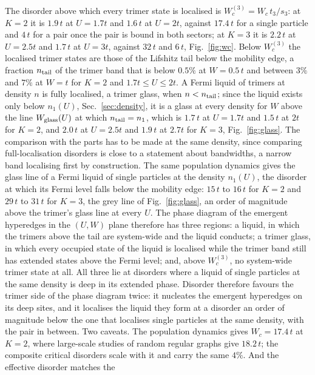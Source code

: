 \documentclass[aps,pre,twocolumn,superscriptaddress,floatfix]{revtex4-2}
\begin{document}
The disorder above which every trimer state is localised is
$W_{c}^{(3)}=W_{c}\,t_{3}/s_{3}$: at $K=2$ it is $1.9\,t$ at $U=1.7t$ and
$1.6\,t$ at $U=2t$, against $17.4\,t$ for a single particle and $4\,t$
for a pair once the pair is bound in both sectors; at $K=3$ it is
$2.2\,t$ at $U=2.5t$ and $1.7\,t$ at $U=3t$, against $32\,t$ and $6\,t$,
Fig.~\ref{fig:wc}. Below $W_{c}^{(3)}$ the localised trimer states are
those of the Lifshitz tail below the mobility edge, a fraction
$n_{\rm tail}$ of the trimer band that is below $0.5\%$ at $W=0.5\,t$
and between $3\%$ and $7\%$ at $W=t$ for $K=2$ and $1.7t\le U\le2t$. A
Fermi liquid of trimers at density $n$ is fully localised, a trimer
glass, when $n<n_{\rm tail}$; since the liquid exists only below
$n_{1}(U)$, Sec.~\ref{sec:density}, it is a glass at every density for
$W$ above the line $W_{\rm glass}(U)$ at which $n_{\rm tail}=n_{1}$,
which is $1.7\,t$ at $U=1.7t$ and $1.5\,t$ at $2t$ for $K=2$, and
$2.0\,t$ at $U=2.5t$ and $1.9\,t$ at $2.7t$ for $K=3$,
Fig.~\ref{fig:glass}. The comparison with the parts has to be made at
the same density, since comparing full-localisation disorders is close
to a statement about bandwidths, a narrow band localising first by
construction. The same population dynamics gives the glass line of a
Fermi liquid of single particles at the density $n_{1}(U)$, the disorder
at which its Fermi level falls below the mobility edge: $15\,t$ to
$16\,t$ for $K=2$ and $29\,t$ to $31\,t$ for $K=3$, the grey line of
Fig.~\ref{fig:glass}, an order of magnitude above the trimer's glass
line at every $U$. The phase diagram of the emergent hyperedges in the
$(U,W)$ plane therefore has three regions: a liquid, in which the
trimers above the tail are system-wide and the liquid conducts; a trimer
glass, in which every occupied state of the liquid is localised while
the trimer band still has extended states above the Fermi level; and,
above $W_{c}^{(3)}$, no system-wide trimer state at all. All three lie
at disorders where a liquid of single particles at the same density is
deep in its extended phase. Disorder therefore favours the trimer side
of the phase diagram twice: it nucleates the emergent hyperedges on its
deep sites, and it localises the liquid they form at a disorder an order
of magnitude below the one that localises single particles at the same
density, with the pair in between. Two caveats. The population dynamics
gives $W_{c}=17.4\,t$ at $K=2$, where large-scale studies of random
regular graphs give $18.2\,t$; the composite critical disorders scale
with it and carry the same $4\%$. And the effective disorder matches the
\end{document}
